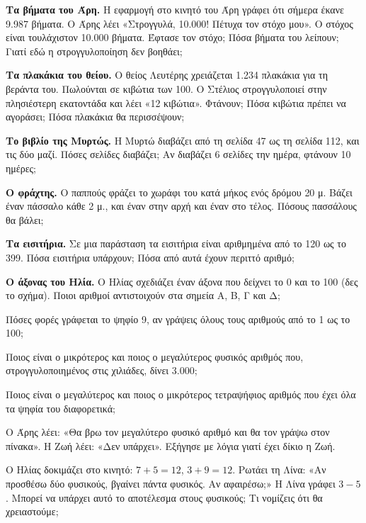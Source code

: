 \ex \textbf{Τα βήματα του Άρη.} Η εφαρμογή στο κινητό του Άρη γράφει ότι σήμερα έκανε 9.987 βήματα. Ο Άρης λέει «Στρογγυλά, 10.000! Πέτυχα τον στόχο μου». Ο στόχος είναι τουλάχιστον 10.000 βήματα. Έφτασε τον στόχο; Πόσα βήματα του λείπουν; Γιατί εδώ η στρογγυλοποίηση δεν βοηθάει;

\ex \textbf{Τα πλακάκια του θείου.} Ο θείος Λευτέρης χρειάζεται 1.234 πλακάκια για τη βεράντα του. Πωλούνται σε κιβώτια των 100. Ο Στέλιος στρογγυλοποιεί στην πλησιέστερη εκατοντάδα και λέει «12 κιβώτια». Φτάνουν; Πόσα κιβώτια πρέπει να αγοράσει; Πόσα πλακάκια θα περισσέψουν;

\ex \textbf{Το βιβλίο της Μυρτώς.} Η Μυρτώ διαβάζει από τη σελίδα 47 ως τη σελίδα 112, και τις δύο μαζί. Πόσες σελίδες διαβάζει; Αν διαβάζει 6 σελίδες την ημέρα, φτάνουν 10 ημέρες;

\ex \textbf{Ο φράχτης.} Ο παππούς φράζει το χωράφι του κατά μήκος ενός δρόμου 20 μ. Βάζει έναν πάσσαλο κάθε 2 μ., και έναν στην αρχή και έναν στο τέλος. Πόσους πασσάλους θα βάλει;

\ex \textbf{Τα εισιτήρια.} Σε μια παράσταση τα εισιτήρια είναι αριθμημένα από το 120 ως το 399. Πόσα εισιτήρια υπάρχουν; Πόσα από αυτά έχουν περιττό αριθμό;

\ex \textbf{Ο άξονας του Ηλία.} Ο Ηλίας σχεδιάζει έναν άξονα που δείχνει το 0 και το 100 (δες το σχήμα). Ποιοι αριθμοί αντιστοιχούν στα σημεία Α, Β, Γ και Δ;

\begin{center}
\end{center}


\ex Πόσες φορές γράφεται το ψηφίο 9, αν γράψεις όλους τους αριθμούς από το 1 ως το 100;

\ex Ποιος είναι ο μικρότερος και ποιος ο μεγαλύτερος φυσικός αριθμός που, στρογγυλοποιημένος στις χιλιάδες, δίνει 3.000;

\ex Ποιος είναι ο μεγαλύτερος και ποιος ο μικρότερος τετραψήφιος αριθμός που έχει όλα τα ψηφία του διαφορετικά;

\ex Ο Άρης λέει: «Θα βρω τον μεγαλύτερο φυσικό αριθμό και θα τον γράψω στον πίνακα». Η Ζωή λέει: «Δεν υπάρχει». Εξήγησε με λόγια γιατί έχει δίκιο η Ζωή.

\ex Ο Ηλίας δοκιμάζει στο κινητό: $7+5=12$, $3+9=12$. Ρωτάει τη Λίνα: «Αν προσθέσω δύο φυσικούς, βγαίνει πάντα φυσικός. Αν αφαιρέσω;» Η Λίνα γράφει $3-5$. Μπορεί να υπάρχει αυτό το αποτέλεσμα στους φυσικούς; Τι νομίζεις ότι θα χρειαστούμε;
